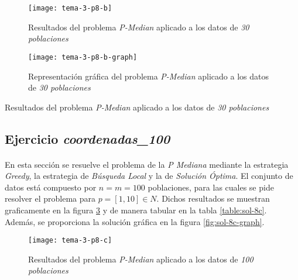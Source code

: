 \documentclass[spanish]{article}
\begin{document}
			\begin{figure}[h]
				\begin{center}
					\texttt{[image: tema-3-p8-b]}
				\end{center}
				\caption{Resultados del problema \emph{P-Median} aplicado a los datos de \emph{30 poblaciones}}
				\label{fig:sol-8b}
			\end{figure}

			\begin{figure}[h]
				\begin{center}
					\texttt{[image: tema-3-p8-b-graph]}
				\end{center}
				\caption{Representación gráfica del problema \emph{P-Median} aplicado a los datos de \emph{30 poblaciones}}
				\label{fig:sol-8b-graph}
			\end{figure}

			\begin{table}[h]
				\begin{center}
				\end{center}
				\caption{Resultados del problema \emph{P-Median} aplicado a los datos de \emph{30 poblaciones}}
				\label{table:sol-8b}
			\end{table}

		\subsection{Ejercicio \emph{coordenadas\_100}}
		\label{sec:e-8c}

			\paragraph{}
			En esta sección se resuelve el problema de la \emph{P Mediana} mediante la estrategia \emph{Greedy}, la estrategia de \emph{Búsqueda Local} y la de \emph{Solución Óptima}. El conjunto de datos está compuesto por $n = m = 100$ poblaciones, para las cuales se pide resolver el problema para $p = [1,10] \in N$. Dichos resultados se muestran graficamente en la figura \ref{fig:sol-8c} y de manera tabular en la tabla \ref{table:sol-8c}. Además, se proporciona la solución gráfica en la figura \ref{fig:sol-8c-graph}.


			\begin{figure}[h]
				\begin{center}
					\texttt{[image: tema-3-p8-c]}
				\end{center}
				\caption{Resultados del problema \emph{P-Median} aplicado a los datos de \emph{100 poblaciones}}
				\label{fig:sol-8c}
			\end{figure}
\end{document}
